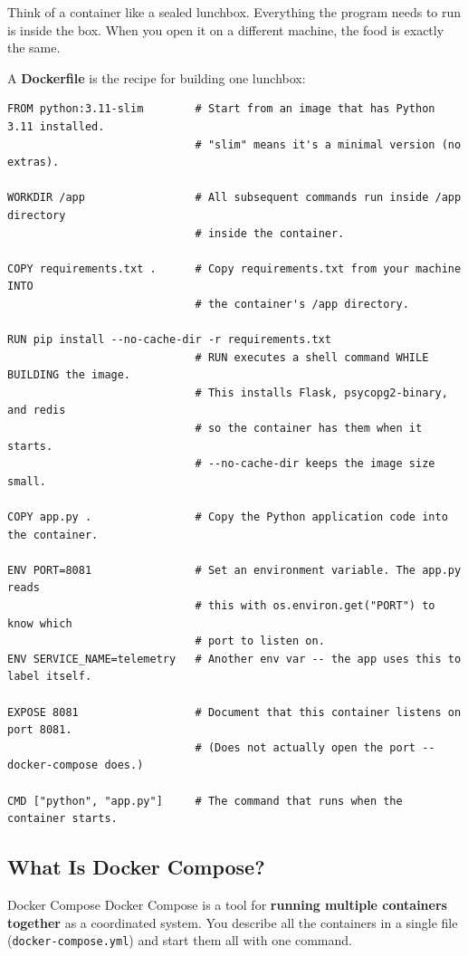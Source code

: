 \documentclass[12pt, a4paper]{article}
\begin{document}
Think of a container like a sealed lunchbox. Everything the program needs to
run is inside the box. When you open it on a different machine, the food is
exactly the same.

A \textbf{Dockerfile} is the recipe for building one lunchbox:

\begin{lstlisting}[style=yaml, caption={services/telemetry/Dockerfile --- building the telemetry container}]
FROM python:3.11-slim        # Start from an image that has Python 3.11 installed.
                             # "slim" means it's a minimal version (no extras).

WORKDIR /app                 # All subsequent commands run inside /app directory
                             # inside the container.

COPY requirements.txt .      # Copy requirements.txt from your machine INTO
                             # the container's /app directory.

RUN pip install --no-cache-dir -r requirements.txt
                             # RUN executes a shell command WHILE BUILDING the image.
                             # This installs Flask, psycopg2-binary, and redis
                             # so the container has them when it starts.
                             # --no-cache-dir keeps the image size small.

COPY app.py .                # Copy the Python application code into the container.

ENV PORT=8081                # Set an environment variable. The app.py reads
                             # this with os.environ.get("PORT") to know which
                             # port to listen on.
ENV SERVICE_NAME=telemetry   # Another env var -- the app uses this to label itself.

EXPOSE 8081                  # Document that this container listens on port 8081.
                             # (Does not actually open the port -- docker-compose does.)

CMD ["python", "app.py"]     # The command that runs when the container starts.
\end{lstlisting}

\subsection{What Is Docker Compose?}

\begin{definitionbox}{Docker Compose}
Docker Compose is a tool for \textbf{running multiple containers together} as a
coordinated system. You describe all the containers in a single file
(\texttt{docker-compose.yml}) and start them all with one command.
\end{definitionbox}
\end{document}
